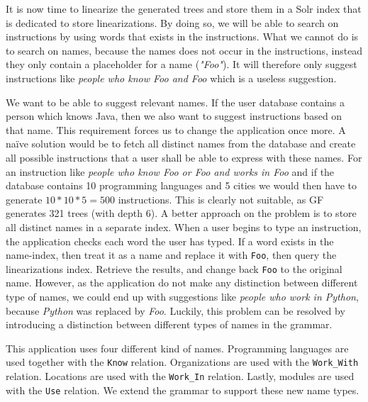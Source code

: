 It is now time to linearize the generated trees and store them in a Solr index that is dedicated to store linearizations. By doing so, we will be able to search on instructions by using words that exists in the instructions. What we cannot do is to search on names, because the names does not occur in the instructions, instead they only contain a placeholder for a name (\emph{"Foo"}). It will therefore only suggest instructions like \emph{people who know Foo and Foo} which is a useless suggestion.

We want to be able to suggest relevant names. If the user database contains a person which knows Java, then we also want to suggest instructions based on that name. This requirement forces us to change the application once more. 
\newline
\newline
A na{\"i}ve solution would be to fetch all distinct names from the database and create all possible instructions that a user shall be able to express with these names. For an instruction like \emph{people who know Foo or Foo and works in Foo} and if the database contains 10 programming languages and 5 cities we would then have to generate $10*10*5=500$ instructions. This is clearly not suitable, as GF generates 321 trees (with depth 6).
\newline
\newline
A better approach on the problem is to store all distinct names in a separate index. When a user begins to type an instruction, the application checks each word the user has typed. If a word exists in the name-index, then treat it as a name and replace it with \texttt{Foo}, then query the linearizations index. Retrieve the results, and change back \texttt{Foo} to the original name. However, as the application do not make any distinction between different type of names, we could end up with suggestions like \emph{people who work in Python}, because \emph{Python} was replaced by \emph{Foo}. Luckily, this problem can be resolved by introducing a distinction between different types of names in the grammar.


This application uses four different kind of names. Programming languages are used together with the \texttt{Know} relation. Organizations are used with the \texttt{Work\_With} relation. Locations are used with the \texttt{Work\_In} relation. Lastly, modules are used with the \texttt{Use} relation. We extend the grammar to support these new name types.

